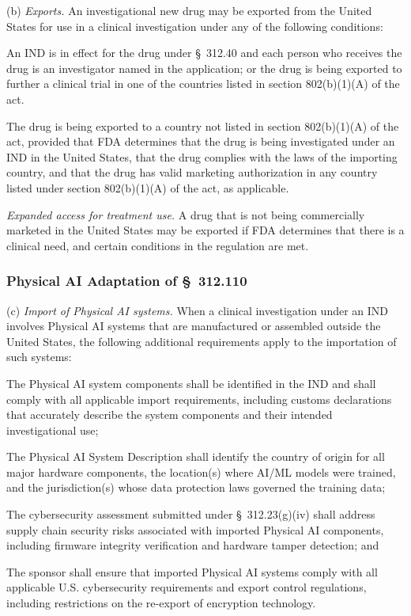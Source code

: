 (b) \textit{Exports.} An investigational new drug may be exported from the United States for use in a clinical investigation under any of the following conditions:

\begin{description}[leftmargin=0.5cm,style=sameline]
\item[(1)] An IND is in effect for the drug under \S~312.40 and each person who receives the drug is an investigator named in the application; or the drug is being exported to further a clinical trial in one of the countries listed in section 802(b)(1)(A) of the act.
\item[(2)] The drug is being exported to a country not listed in section 802(b)(1)(A) of the act, provided that FDA determines that the drug is being investigated under an IND in the United States, that the drug complies with the laws of the importing country, and that the drug has valid marketing authorization in any country listed under section 802(b)(1)(A) of the act, as applicable.
\item[(3)] \textit{Expanded access for treatment use.} A drug that is not being commercially marketed in the United States may be exported if FDA determines that there is a clinical need, and certain conditions in the regulation are met.
\end{description}

\subsubsection{Physical AI Adaptation of \S~312.110}

(c) \textit{Import of Physical AI systems.} When a clinical investigation under an IND involves Physical AI systems that are manufactured or assembled outside the United States, the following additional requirements apply to the importation of such systems:

\begin{description}[leftmargin=0.8cm,style=sameline]
\item[(i)] The Physical AI system components shall be identified in the IND and shall comply with all applicable import requirements, including customs declarations that accurately describe the system components and their intended investigational use;
\item[(ii)] The Physical AI System Description shall identify the country of origin for all major hardware components, the location(s) where AI/ML models were trained, and the jurisdiction(s) whose data protection laws governed the training data;
\item[(iii)] The cybersecurity assessment submitted under \S~312.23(g)(iv) shall address supply chain security risks associated with imported Physical AI components, including firmware integrity verification and hardware tamper detection; and
\item[(iv)] The sponsor shall ensure that imported Physical AI systems comply with all applicable U.S. cybersecurity requirements and export control regulations, including restrictions on the re-export of encryption technology.
\end{description}

